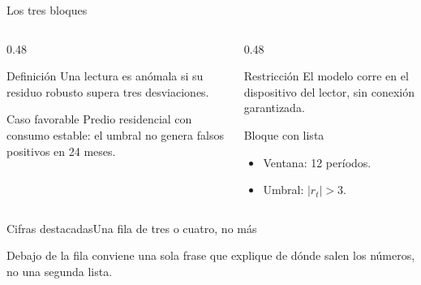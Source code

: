 \documentclass[11pt,aspectratio=169,xcolor=table]{beamer}
\begin{document}
\begin{frame}{Los tres bloques}
  \begin{columns}[T,onlytextwidth]
    \begin{column}{0.48\textwidth}
      \begin{block}{Definición}
        Una lectura es anómala si su residuo robusto supera tres desviaciones.
      \end{block}
      \begin{exampleblock}{Caso favorable}
        Predio residencial con consumo estable: el umbral no genera falsos
        positivos en 24 meses.
      \end{exampleblock}
    \end{column}
    \begin{column}{0.48\textwidth}
      \begin{alertblock}{Restricción}
        El modelo corre en el dispositivo del lector, sin conexión garantizada.
      \end{alertblock}
      \begin{block}{Bloque con lista}
        \begin{itemize}
          \item Ventana: 12 períodos.
          \item Umbral: $|r_t| > 3$.
        \end{itemize}
      \end{block}
    \end{column}
  \end{columns}
\end{frame}

\begin{frame}{Cifras destacadas}{Una fila de tres o cuatro, no más}

  \vfill
  Debajo de la fila conviene una sola frase que explique de dónde salen los
  números, no una segunda lista.
\end{frame}
\end{document}
